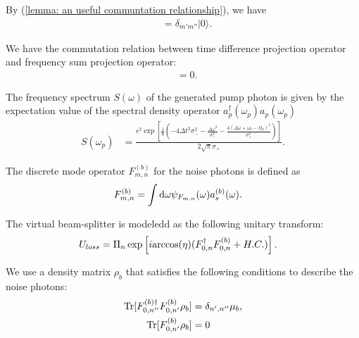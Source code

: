 \documentclass[../../note.tex]{subfiles}
\begin{document}
\begin{corollary}
    By (\ref{lemma: an useful communtation relationship}), we have
    \begin{align}
        [B_{m'},B_{m''}^\dagger]
        &= \delta_{m'm''} \vert 0 \rangle.
    \end{align}
\end{corollary}

\begin{lemma}
    We have the commutation relation between time difference projection operator and frequency sum projection operator:
    \begin{align}
        [P_{\delta_{\omega}}(\omega), P_{\delta_t}(t)]
        &= 0.
    \end{align}
\end{lemma}

\begin{lemma}
    The frequency spectrum $S(\omega)$ of the generated pump photon is given by the expectation value of the spectral density operator $a_p^\dagger(\omega_p)a_{p}(\omega_p)$ 
    \begin{align}
        S(\omega_p)
        &= \frac{\epsilon^2 \exp\left[\frac{1}{8}\left(-4 \Delta t^2 \sigma_-^2 - \frac{\Delta \omega^2}{\sigma_-^2} - \frac{4(\Delta \omega + \omega_0 - \Omega_p)^2}{\sigma_+^2} \right)\right]}{2 \sqrt{\pi} \sigma_+}.
    \end{align}
\end{lemma}

\begin{definition}
    The discrete mode operator $F_{m,n}^(b)$ for the noise photons is defined as
    \begin{align}
        F_{m,n}^{(b)}
        &= \int {\rm d}\omega \psi_{F_{m,n}}(\omega)a_s^{(b)}(\omega). 
    \end{align}
\end{definition}

\begin{definition}
    The virtual beam-splitter is modeledd as the following unitary transform:
    \begin{align}
        U_{loss}
        &= \Pi_{n} \exp\left[i {\rm arccos}(\eta)(F_{0,n}^\dagger F_{0,n}^{(b)} + H.C.)\right].
    \end{align}
\end{definition}

\begin{definition}
    We use a density matrix $\rho_b$ that satisfies the following conditions to describe the noise photons:
    \begin{align}
        \operatorname{Tr}[F_{0,n''}^{(b) \dagger} F_{0,n'}^{(b)} \rho_b] 
        &= \delta_{n',n''} \mu_b, \\
        \operatorname{Tr}[F_{0,n'}^{(b)} \rho_b]
        &= 0
    \end{align}
\end{definition}
\end{document}
